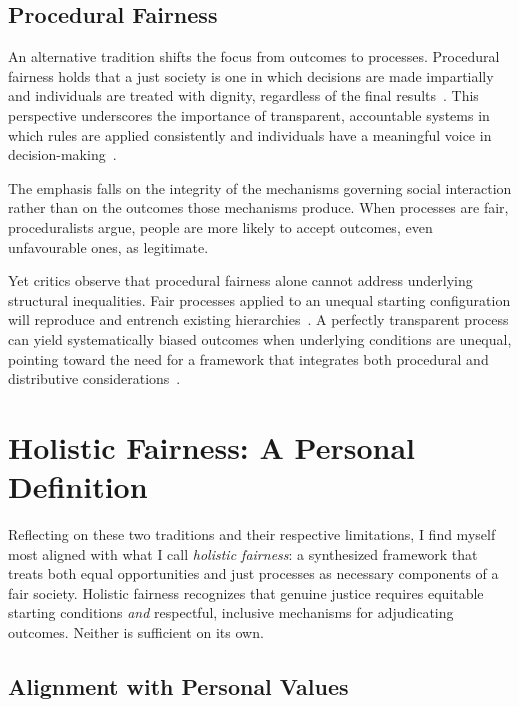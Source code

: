 \documentclass[11pt,showkeys]{essay}
\begin{document}
\subsection{Procedural Fairness}

An alternative tradition shifts the focus from outcomes to processes. Procedural fairness holds that a just society is one in which decisions are made impartially and individuals are treated with dignity, regardless of the final results~\cite{dahlstrom_what_nd,mushtaq_basic_2020}. This perspective underscores the importance of transparent, accountable systems in which rules are applied consistently and individuals have a meaningful voice in decision-making~\cite{canada_what_2017}.

The emphasis falls on the integrity of the mechanisms governing social interaction rather than on the outcomes those mechanisms produce. When processes are fair, proceduralists argue, people are more likely to accept outcomes, even unfavourable ones, as legitimate.

Yet critics observe that procedural fairness alone cannot address underlying structural inequalities. Fair processes applied to an unequal starting configuration will reproduce and entrench existing hierarchies~\cite{macdonald_judicial_1980,galligan_procedural_1997}. A perfectly transparent process can yield systematically biased outcomes when underlying conditions are unequal, pointing toward the need for a framework that integrates both procedural and distributive considerations~\cite{ferguson_procedural_2014,hooker_review_2003,morse_do_2022}.

\section{Holistic Fairness: A Personal Definition}

Reflecting on these two traditions and their respective limitations, I find myself most aligned with what I call \textit{holistic fairness}: a synthesized framework that treats both equal opportunities and just processes as necessary components of a fair society. Holistic fairness recognizes that genuine justice requires equitable starting conditions \textit{and} respectful, inclusive mechanisms for adjudicating outcomes. Neither is sufficient on its own.

\subsection{Alignment with Personal Values}
\end{document}
